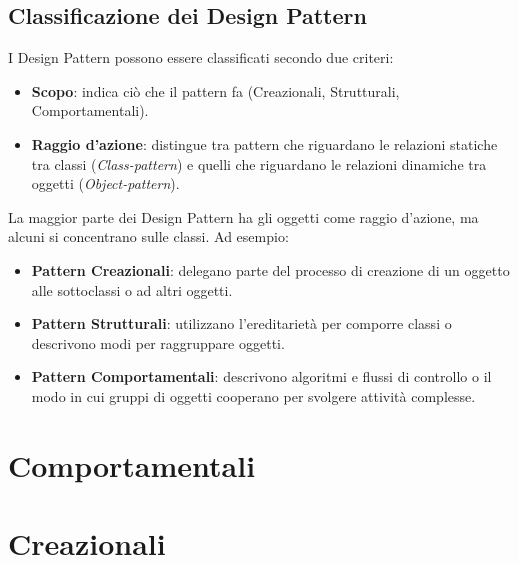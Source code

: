 \subsection{Classificazione dei Design Pattern}
I Design Pattern possono essere classificati secondo due criteri:
\begin{itemize}
    \item \textbf{Scopo}: indica ciò che il pattern fa (Creazionali, Strutturali, Comportamentali).
    \item \textbf{Raggio d’azione}: distingue tra pattern che riguardano le relazioni statiche tra classi (\textit{Class-pattern}) e quelli che riguardano le relazioni dinamiche tra oggetti (\textit{Object-pattern}).
\end{itemize}

La maggior parte dei Design Pattern ha gli oggetti come raggio d’azione, ma alcuni si concentrano sulle classi. Ad esempio:
\begin{itemize}
    \item \textbf{Pattern Creazionali}: delegano parte del processo di creazione di un oggetto alle sottoclassi o ad altri oggetti.
    \item \textbf{Pattern Strutturali}: utilizzano l’ereditarietà per comporre classi o descrivono modi per raggruppare oggetti.
    \item \textbf{Pattern Comportamentali}: descrivono algoritmi e flussi di controllo o il modo in cui gruppi di oggetti cooperano per svolgere attività complesse.
\end{itemize}

\newpage

\section{Comportamentali}













\section{Creazionali}

